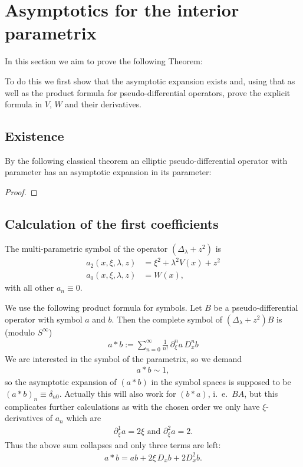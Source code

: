 \section{Asymptotics for the interior parametrix}
In this section we aim to prove the following Theorem:

To do this we first show that the asymptotic expansion exists and, using that as
well as the product formula for pseudo-differential operators, prove the
explicit formula in $V$, $W$ and their derivatives.
\subsection{Existence}
By the following classical theorem an elliptic pseudo-differential operator with
parameter has an asymptotic expansion in its parameter:

\begin{proof}
\end{proof}

\subsection{Calculation of the first coefficients}
The multi-parametric symbol of the operator $(\Delta_\lambda + z^2)$ is
\begin{align}
    a_2(x,\xi,\lambda,z) &= \xi^2 + \lambda^2 V(x) + z^2 \\
    a_0(x,\xi,\lambda,z) &= W(x),
    \label{eqn:symbol}
\end{align}
with all other $a_n \equiv 0$.

We use the following product formula for symbols. Let $B$ be a
pseudo-differential operator with symbol $a$ and $b$. Then the complete symbol
of $(\Delta_\lambda + z^2)B$ is (modulo $S^\infty$)
\begin{align}
  a * b := \sum_{n=0}^{\infty} \frac{1}{n!}\ \partial_\xi^n a\,D_x^n b
  \label{eqn:product-formula}
\end{align}
We are interested in the symbol of the parametrix, so we demand
\begin{align*}
  a * b \sim 1,
\end{align*}
so the asymptotic expansion of $(a*b)$ in the symbol spaces is supposed to be
$(a * b)_n \equiv \delta_{n0}$. Actually this will also work for $(b * a)$,
i.~e.\ $BA$, but this complicates further calculations as with the chosen order
we only have $\xi$-derivatives of $a_n$ which are
\begin{align}
  \partial_{\xi}^1 a = 2\xi \text{ and } \partial_{\xi}^2 a = 2.
\end{align}
Thus the above sum collapses and only three terms are left:
\begin{align}
  a * b = ab + 2\xi\,D_x b + 2D_x^2 b.
\end{align}

